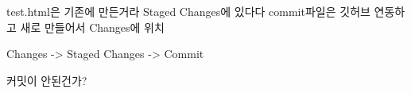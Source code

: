 test.html은 기존에 만든거라 Staged Changes에 있다다
commit파일은 깃허브 연동하고 새로 만들어서 Changes에 위치

Changes -> Staged Changes -> Commit

커밋이 안된건가?